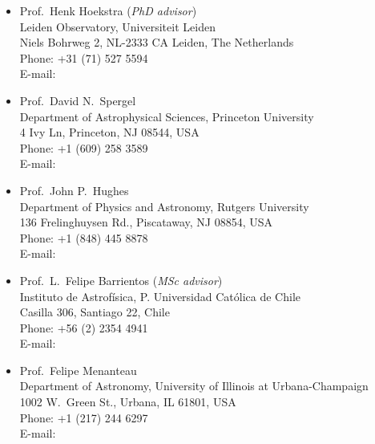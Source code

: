 \documentclass[11pt]{article}
\begin{document}

\begin{itemize}
 \item Prof.~Henk Hoekstra (\textit{PhD advisor})\\
       Leiden Observatory, Universiteit Leiden\\
       Niels Bohrweg 2, NL-2333 CA Leiden, The Netherlands\\
       Phone: +31 (71) 527 5594\\
       E-mail: 
 \item Prof.~David N.~Spergel\\
       Department of Astrophysical Sciences, Princeton University\\
       4 Ivy Ln, Princeton, NJ 08544, USA\\
       Phone: +1 (609) 258 3589\\
       E-mail: 
 \item Prof.~John P.~Hughes\\
       Department of Physics and Astronomy, Rutgers University\\
       136 Frelinghuysen Rd., Piscataway, NJ 08854, USA\\
       Phone: +1 (848) 445 8878\\
       E-mail: 
 \item Prof.~L.~Felipe Barrientos (\textit{MSc advisor})\\
       Instituto de Astrof\'isica, P. Universidad Cat\'olica de Chile\\
       Casilla 306, Santiago 22, Chile\\
       Phone: +56 (2) 2354 4941\\
       E-mail: 
 \item Prof.~Felipe Menanteau\\
       Department of Astronomy, University of Illinois at Urbana-Champaign\\
       1002 W.\ Green St., Urbana, IL 61801, USA\\
       Phone: +1 (217) 244 6297\\
       E-mail: 
\end{itemize}

\vspace{0.3cm}
\hline




\pagebreak

\end{document}
